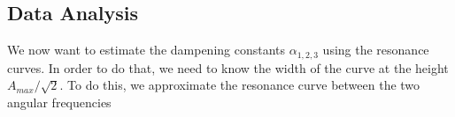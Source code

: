 \subsection{Data Analysis}

We now want to estimate the dampening constants $\alpha_{1, 2, 3}$ using the resonance curves.
In order to do that, we need to know the width of the curve at the height $A_{max}/\sqrt{2}$.
To do this, we approximate the resonance curve between the two angular frequencies
